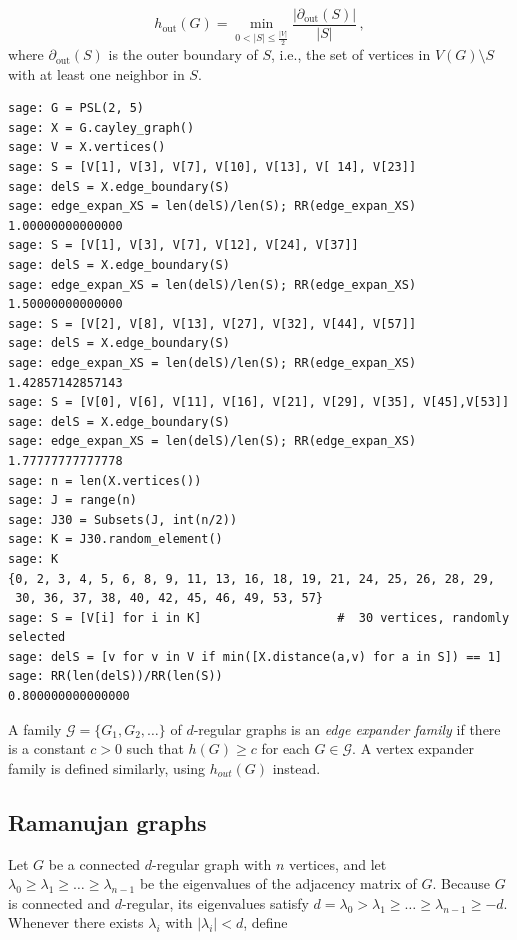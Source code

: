\[
    h_{\text{out}}(G)
= \min_{0 < |S|\le \frac{|V|}{2}} \frac{|\partial_{\text{out}}(S)|}{|S|}\,,
\]
where $\partial_{\text{out}}(S)$ is the outer boundary of $S$, i.e.,
the set of vertices in
$V(G)\setminus S$ with at least one neighbor in $S$.

\begin{lstlisting}
sage: G = PSL(2, 5)
sage: X = G.cayley_graph()
sage: V = X.vertices()
sage: S = [V[1], V[3], V[7], V[10], V[13], V[ 14], V[23]]
sage: delS = X.edge_boundary(S)
sage: edge_expan_XS = len(delS)/len(S); RR(edge_expan_XS)
1.00000000000000
sage: S = [V[1], V[3], V[7], V[12], V[24], V[37]]
sage: delS = X.edge_boundary(S)
sage: edge_expan_XS = len(delS)/len(S); RR(edge_expan_XS)
1.50000000000000
sage: S = [V[2], V[8], V[13], V[27], V[32], V[44], V[57]]
sage: delS = X.edge_boundary(S)
sage: edge_expan_XS = len(delS)/len(S); RR(edge_expan_XS)
1.42857142857143
sage: S = [V[0], V[6], V[11], V[16], V[21], V[29], V[35], V[45],V[53]]
sage: delS = X.edge_boundary(S)
sage: edge_expan_XS = len(delS)/len(S); RR(edge_expan_XS)
1.77777777777778
sage: n = len(X.vertices())
sage: J = range(n)
sage: J30 = Subsets(J, int(n/2))
sage: K = J30.random_element()
sage: K
{0, 2, 3, 4, 5, 6, 8, 9, 11, 13, 16, 18, 19, 21, 24, 25, 26, 28, 29,
 30, 36, 37, 38, 40, 42, 45, 46, 49, 53, 57}
sage: S = [V[i] for i in K]                   #  30 vertices, randomly selected
sage: delS = [v for v in V if min([X.distance(a,v) for a in S]) == 1]
sage: RR(len(delS))/RR(len(S))
0.800000000000000
\end{lstlisting}

A family $\mathcal{G} = \{G_1, G_2, \ldots \}$ of $d$-regular graphs is an
{\it edge expander family} if there is a constant $c > 0$ such that
$h(G) \ge c$ for each $G \in \mathcal{G}$.
A vertex expander family is defined similarly, using $h_{out}(G)$
instead.

\subsection{Ramanujan graphs}

Let $G$ be a connected $d$-regular graph with $n$ vertices, and let
$\lambda_0 \geq \lambda_1 \geq \ldots \geq \lambda_{n-1}$
be the eigenvalues of the adjacency matrix of
$G$. Because $G$ is connected and $d$-regular, its eigenvalues satisfy
$d = \lambda_0 > \lambda_1 \geq \ldots \geq \lambda_{n-1} \geq -d$.
Whenever there exists $\lambda_i$ with $| \lambda_i | < d$, define

